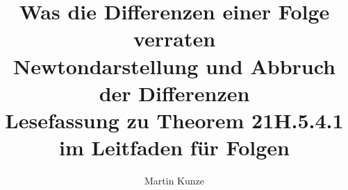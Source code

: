 \documentclass[a4paper,11pt]{article}
\title{Was die Differenzen einer Folge verraten\\[.5em]
\large Newtondarstellung und Abbruch der Differenzen\\
Lesefassung zu Theorem 21H.5.4.1 im Leitfaden für Folgen}
\author{Martin Kunze}
\date{}
\begin{document}
\maketitle
\hypertarget{newton.reading}{}


\end{document}
